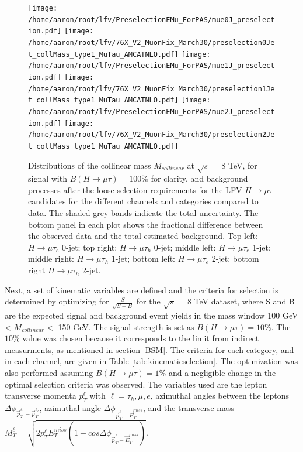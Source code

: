 \documentclass[oneside, letterpaper, oldfontcommands]{memoir}
\begin{document}
\begin{figure}[hbtp]\centering
 \texttt{[image: /home/aaron/root/lfv/PreselectionEMu\_ForPAS/mue0J\_preselection.pdf]}
 \texttt{[image: /home/aaron/root/lfv/76X\_V2\_MuonFix\_March30/preselection0Jet\_collMass\_type1\_MuTau\_AMCATNLO.pdf]}
 \texttt{[image: /home/aaron/root/lfv/PreselectionEMu\_ForPAS/mue1J\_preselection.pdf]}
 \texttt{[image: /home/aaron/root/lfv/76X\_V2\_MuonFix\_March30/preselection1Jet\_collMass\_type1\_MuTau\_AMCATNLO.pdf]}
 \texttt{[image: /home/aaron/root/lfv/PreselectionEMu\_ForPAS/mue2J\_preselection.pdf]}
 \texttt{[image: /home/aaron/root/lfv/76X\_V2\_MuonFix\_March30/preselection2Jet\_collMass\_type1\_MuTau\_AMCATNLO.pdf]}
 \caption{Distributions of the collinear mass $M_{collinear}$ at $\sqrt{s}$ = 8 TeV, for signal with $B(H \rightarrow \mu \tau )=100\%$ for clarity, and background processes after the loose selection requirements for the LFV $H \rightarrow \mu \tau$ candidates for the different channels and categories compared to data. The shaded grey bands indicate the total uncertainty. The bottom panel in each plot shows the fractional difference between the observed data and the total estimated background.  Top left: $H \rightarrow \mu \tau_{e}$ 0-jet; top right: $H \rightarrow \mu \tau_{h}$ 0-jet;  middle left: $H \rightarrow \mu \tau_{e}$ 1-jet; middle right: $H \rightarrow \mu \tau_{h}$
1-jet; bottom left: $H \rightarrow \mu \tau_{e}$ 2-jet; bottom right $H \rightarrow \mu \tau_{h}$ 2-jet. }
 \label{fig:Mcol_after_presel_WITHDATA_13TeV}\end{figure}

\qquad Next, a set of kinematic variables are defined and the criteria for selection is determined by optimizing for $\frac{S}{\sqrt{S+B}}$ for the $\sqrt{s}$ = 8 TeV dataset, where S and B are the expected signal and background event yields in the mass window 100 GeV < $M_{collinear} <$ 150 GeV. The signal strength is set as $B(H\rightarrow\mu\tau) = 10\%$. The $10\%$ value was chosen because it corresponds to the limit from indirect measurments, as mentioned in section \ref{BSM}. The criteria for each category, and in each channel, are given in Table \ref{tab:kinematicselection}. The optimization was also performed assuming $B(H\rightarrow\mu\tau) = 1\%$ and a negligible change in the optimal selection criteria was observed. The variables used are the lepton transverse momenta $p_{T}^{\ell}$ with $\ell = \tau_{h},\mu,e$, azimuthal angles between the leptons 
$\Delta\phi_{\vec{p}_{T}^{\ell_{1}}-\vec{p}_{T}^{\ell_{2}}}$, azimuthal angle 
$\Delta\phi_{\vec{p}_{T}^{\ell}-\vec{E}_{T}^{miss}}$, and the transverse mass 
$M_{T}^{\ell} = \sqrt{2 p_{T}^{\ell}E_{T}^{miss}(1-cos \Delta\phi_{\vec{p}_{T}^{\ell}-\vec{E}_{T}^{miss}})}$. 
\end{document}
